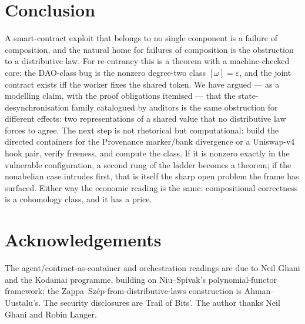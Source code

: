 \documentclass[11pt]{amsart}
\theoremstyle{definition}
\theoremstyle{remark}
\begin{document}
\section{Conclusion}\label{sec:concl}

A smart-contract exploit that belongs to no single component is a failure of composition, and the
natural home for failures of composition is the obstruction to a distributive law. For re-entrancy
this is a theorem with a machine-checked core: the DAO-class bug is the nonzero degree-two class
$[\omega]=\varepsilon$, and the joint contract exists iff the worker fixes the shared token. We have
argued --- as a modelling claim, with the proof obligations itemised --- that the
state-desynchronisation family catalogued by auditors is the same obstruction for different effects:
two representations of a shared value that no distributive law forces to agree. The next step is not
rhetorical but computational: build the directed containers for the Provenance marker/bank divergence
or a Uniswap-v4 hook pair, verify freeness, and compute the class. If it is nonzero exactly in the
vulnerable configuration, a second rung of the ladder becomes a theorem; if the nonabelian case
intrudes first, that is itself the sharp open problem the frame has surfaced. Either way the economic
reading is the same: compositional correctness is a cohomology class, and it has a price.

\section*{Acknowledgements}
The agent/contract-as-container and orchestration readings are due to Neil Ghani and the Kodamai
programme, building on Niu--Spivak's polynomial-functor framework; the Zappa--Sz\'ep-from-distributive-laws
construction is Ahman--Uustalu's. The security disclosures are Trail of Bits'. The author thanks Neil
Ghani and Robin Langer.
\end{document}
